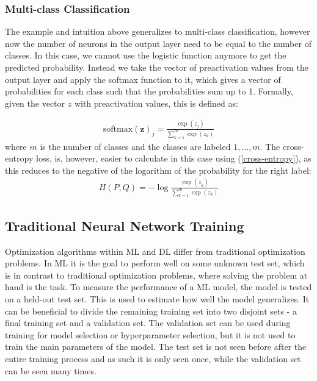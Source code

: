 \subsubsection{Multi-class Classification}
The example and intuition above generalizes to multi-class classification, however now the number of neurons in the output layer need to be equal to the number of classes. In this case, we cannot use the logistic function anymore to get the predicted probability. Instead we take the vector of preactivation values from the output layer and apply the softmax function to it, which gives a vector of probabilities for each class such that the probabilities sum up to 1. Formally, given the vector $z$ with preactivation values, this is defined as: 

\begin{align}
    \label{softmax} \text{softmax} (\mathbf{z})_j = \frac{\exp(z_j)}{\sum_{k=1}^m \exp(z_k)}
\end{align}
where $m$ is the number of classes and the classes are labeled $1, \ldots, m$. The cross-entropy loss, is, however, easier to calculate in this case using (\ref{cross-entropy}), as this reduces to the negative of the logarithm of the probability for the right label:
\begin{align*}
    H(P,Q) = - \log \frac{\exp(z_y)} {\sum_{k=1}^m \exp(z_k)}
\end{align*}



\subsection{Traditional Neural Network Training}
Optimization algorithms within ML and DL differ from traditional optimization problems. In ML it is the goal to perform well on some unknown test set, which is in contrast to traditional optimization problems, where solving the problem at hand is the task. To measure the performance of a ML model, the model is tested on a held-out test set. This is used to estimate how well the model generalizes. It can be beneficial to divide the remaining training set into two disjoint sets - a final training set and a validation set. The validation set can be used during training for model selection or hyperparameter selection, but it is not used to train the main parameters of the model. The test set is not seen before after the entire training process and as such it is only seen once, while the validation set can be seen many times. \\ 


